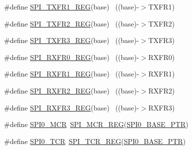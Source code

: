 \begin{DoxyCompactItemize}
\item 
\#define \hyperlink{group___s_p_i___register___accessor___macros_ga9011fe0adbd2dce8076c23bbe8aef929}{S\+P\+I\+\_\+\+T\+X\+F\+R1\+\_\+\+R\+EG}(base)                                        ~((base)-\/$>$T\+X\+F\+R1)
\item 
\#define \hyperlink{group___s_p_i___register___accessor___macros_ga54c1e67e69fb1a8b1baef7a520df5e39}{S\+P\+I\+\_\+\+T\+X\+F\+R2\+\_\+\+R\+EG}(base)                                        ~((base)-\/$>$T\+X\+F\+R2)
\item 
\#define \hyperlink{group___s_p_i___register___accessor___macros_gac353c1ece16b5024b887c728cbe32d34}{S\+P\+I\+\_\+\+T\+X\+F\+R3\+\_\+\+R\+EG}(base)                                        ~((base)-\/$>$T\+X\+F\+R3)
\item 
\#define \hyperlink{group___s_p_i___register___accessor___macros_ga0f6e212d734b440c0b7e16d3389a6687}{S\+P\+I\+\_\+\+R\+X\+F\+R0\+\_\+\+R\+EG}(base)                                        ~((base)-\/$>$R\+X\+F\+R0)
\item 
\#define \hyperlink{group___s_p_i___register___accessor___macros_gacf895cbc35557f8f25eff12d7e84d582}{S\+P\+I\+\_\+\+R\+X\+F\+R1\+\_\+\+R\+EG}(base)                                        ~((base)-\/$>$R\+X\+F\+R1)
\item 
\#define \hyperlink{group___s_p_i___register___accessor___macros_ga23c02a896d81445dbdea2e8d0d490b0a}{S\+P\+I\+\_\+\+R\+X\+F\+R2\+\_\+\+R\+EG}(base)                                        ~((base)-\/$>$R\+X\+F\+R2)
\item 
\#define \hyperlink{group___s_p_i___register___accessor___macros_ga2419cd7143d831f0a31ac7bda0da7af7}{S\+P\+I\+\_\+\+R\+X\+F\+R3\+\_\+\+R\+EG}(base)                                        ~((base)-\/$>$R\+X\+F\+R3)
\item 
\#define \hyperlink{group___s_p_i___register___accessor___macros_gaad4d9e80de527e18ba0e9d5d2bb296f1}{S\+P\+I0\+\_\+\+M\+CR}~\hyperlink{group___s_p_i___register___accessor___macros_gae54fdee07e5ec098efe6da63f34f2ecd}{S\+P\+I\+\_\+\+M\+C\+R\+\_\+\+R\+EG}(\hyperlink{group___s_p_i___peripheral_ga851f64a97b5919c1f99a34db5918b3b4}{S\+P\+I0\+\_\+\+B\+A\+S\+E\+\_\+\+P\+TR})
\item 
\#define \hyperlink{group___s_p_i___register___accessor___macros_ga210fb00eb7662406b9ecf9d26d6b59b7}{S\+P\+I0\+\_\+\+T\+CR}~\hyperlink{group___s_p_i___register___accessor___macros_gac7b659989db7f592b223186299d8535e}{S\+P\+I\+\_\+\+T\+C\+R\+\_\+\+R\+EG}(\hyperlink{group___s_p_i___peripheral_ga851f64a97b5919c1f99a34db5918b3b4}{S\+P\+I0\+\_\+\+B\+A\+S\+E\+\_\+\+P\+TR})

\end{DoxyCompactItemize}

